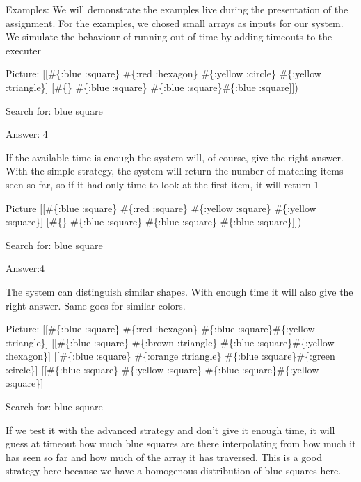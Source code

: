 \documentclass[presentation]{beamer}
\begin{document}
\begin{frame}[label=sec-2]{Examples:}
We will demonstrate the examples live during the presentation of the assignment.
For the examples, we chosed small arrays as inputs for our system.
We simulate the behaviour of running out of time by adding timeouts to the 
executer
\begin{block}{1}
Picture:
[[\#\{:blue :square\} \#\{:red :hexagon\} \#\{:yellow :circle\} \#\{:yellow :triangle\}]
 [\#\{\} \#\{:blue :square\} \#\{:blue :square\}\#\{:blue :square]])


Search for: blue square


Answer: 4


If the available time is enough the system will, of course, give the right answer.
With the simple strategy, the system will return the number of matching items 
seen so far, so if it had only time to look at the first item, it will return
1
\end{block}
\begin{block}{2}
Picture
[[\#\{:blue :square\} \#\{:red :square\} \#\{:yellow :square\} \#\{:yellow :square\}]
 [\#\{\} \#\{:blue :square\} \#\{:blue :square\} \#\{:blue :square\}]])


Search for: blue square


Answer:4


The system can distinguish similar shapes. With enough time it will also give the right answer.
Same goes for similar colors.
\end{block}

\begin{block}{3}
Picture:
[[\#\{:blue :square\} \#\{:red :hexagon\} \#\{:blue :square\}\#\{:yellow :triangle\}] 
[[\#\{:blue :square\} \#\{:brown :triangle\} \#\{:blue :square\}\#\{:yellow :hexagon\}] 
[[\#\{:blue :square\} \#\{:orange :triangle\} \#\{:blue :square\}\#\{:green :circle\}] 
[[\#\{:blue :square\} \#\{:yellow :square\} \#\{:blue :square\}\#\{:yellow :square\}] 


Search for: blue square


If we test it with the advanced strategy and don't give it enough time, it will 
guess at timeout how much blue squares are there interpolating from how much
it has seen so far and how much of the array it has traversed.
This is a good strategy here because we have a homogenous distribution of blue 
squares here.
\end{block}
\end{frame}
\end{document}
